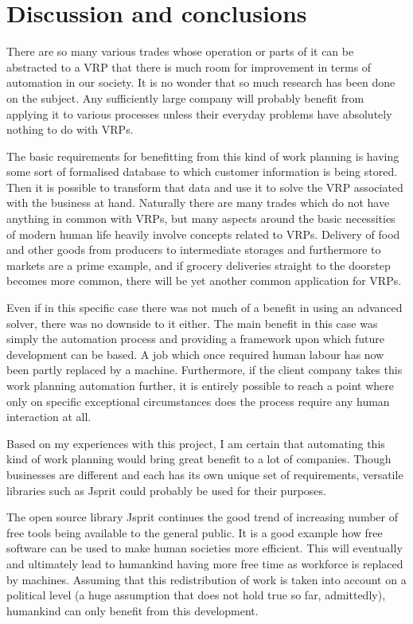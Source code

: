 \chapter{Discussion and conclusions}
\label{chapter:discussion}

There are so many various trades whose operation or parts of it can be abstracted to a VRP that there is much room for improvement in terms of automation in our society. It is no wonder that so much research has been done on the subject. Any sufficiently large company will probably benefit from applying it to various processes unless their everyday problems have absolutely nothing to do with VRPs.

The basic requirements for benefitting from this kind of work planning is having some sort of formalised database to which customer information is being stored. Then it is possible to transform that data and use it to solve the VRP associated with the business at hand. Naturally there are many trades which do not have anything in common with VRPs, but many aspects around the basic necessities of modern human life heavily involve concepts related to VRPs. Delivery of food and other goods from producers to intermediate storages and furthermore to markets are a prime example, and if grocery deliveries straight to the doorstep becomes more common, there will be yet another common application for VRPs.  

Even if in this specific case there was not much of a benefit in using an advanced solver, there was no downside to it either. The main benefit in this case was simply the automation process and providing a framework upon which future development can be based. A job which once required human labour has now been partly replaced by a machine. Furthermore, if the client company takes this work planning automation further, it is entirely possible to reach a point where only on specific exceptional circumstances does the process require any human interaction at all. 

Based on my experiences with this project, I am certain that automating this kind of work planning would bring great benefit to a lot of companies. Though businesses are different and each has its own unique set of requirements, versatile libraries such as Jsprit could probably be used for their purposes.

The open source library Jsprit continues the good trend of increasing number of free tools being available to the general public. It is a good example how free software can be used to make human societies more efficient. This will eventually and ultimately lead to humankind having more free time as workforce is replaced by machines. Assuming that this redistribution of work is taken into account on a political level (a huge assumption that does not hold true so far, admittedly), humankind can only benefit from this development.



